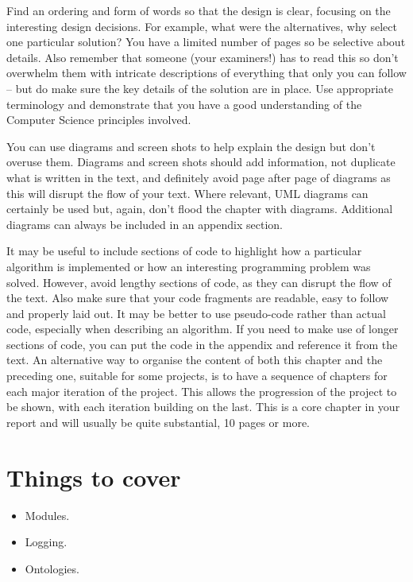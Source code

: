 \documentclass[ openright,titlepage,numbers=noenddot,headinclude,%
                footinclude=true,BCOR=5mm,paper=a4,fontsize=12pt,a4paper,english%
                ]{scrreprt}
\begin{document}
Find an ordering and form of words so that the design is clear, focusing on the interesting design decisions. For example, what were the alternatives, why select one particular solution? You have a limited number of pages so be selective about details. Also remember that someone (your examiners!) has to read this so don’t overwhelm them with intricate descriptions of everything that only you can follow – but do make sure the key details of the solution are in place. Use appropriate terminology and demonstrate that you have a good understanding of the Computer Science principles involved.

You can use diagrams and screen shots to help explain the design but don’t overuse them. Diagrams and screen shots should add information, not duplicate what is written in the text, and definitely avoid page after page of diagrams as this will disrupt the flow of your text. Where relevant, UML diagrams can certainly be used but, again, don’t flood the chapter with diagrams. Additional diagrams can always be included in an appendix section.

It may be useful to include sections of code to highlight how a particular algorithm is implemented or how an interesting programming problem was solved. However, avoid lengthy sections of code, as they can disrupt the flow of the text. Also make sure that your code fragments are readable, easy to follow and properly laid out. It may be better to use pseudo-code rather than actual code, especially when describing an algorithm. If you need to make use of longer sections of code, you can put the code in the appendix and reference it from the text.
An alternative way to organise the content of both this chapter and the preceding one, suitable for some projects, is to have a sequence of chapters for each major iteration of the project. This allows the progression of the project to be shown, with each iteration building on the last.
This is a core chapter in your report and will usually be quite substantial, 10 pages or more.

\section{Things to cover}
\begin{itemize}
\item Modules.
\item Logging.
\item Ontologies.
\end{itemize}
\end{document}
